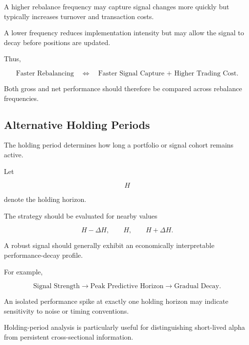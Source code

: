 \documentclass[11pt,a4paper]{article}
\begin{document}
A higher rebalance frequency may capture signal changes more quickly but
typically increases turnover and transaction costs.

A lower frequency reduces implementation intensity but may allow the signal to
decay before positions are updated.

Thus,

\begin{equation}
\boxed{
\text{Faster Rebalancing}
\quad\Longleftrightarrow\quad
\text{Faster Signal Capture + Higher Trading Cost}.
}
\end{equation}

Both gross and net performance should therefore be compared across rebalance
frequencies.


\subsection{Alternative Holding Periods}
\label{subsec:alternative_holding_periods}

The holding period determines how long a portfolio or signal cohort remains
active.

Let

\begin{equation}
H
\end{equation}

denote the holding horizon.

The strategy should be evaluated for nearby values

\begin{equation}
H-\Delta H,
\qquad
H,
\qquad
H+\Delta H.
\end{equation}

A robust signal should generally exhibit an economically interpretable
performance-decay profile.

For example,

\begin{equation}
\boxed{
\text{Signal Strength}
\rightarrow
\text{Peak Predictive Horizon}
\rightarrow
\text{Gradual Decay}.
}
\end{equation}

An isolated performance spike at exactly one holding horizon may indicate
sensitivity to noise or timing conventions.

Holding-period analysis is particularly useful for distinguishing short-lived
alpha from persistent cross-sectional information.
\end{document}
